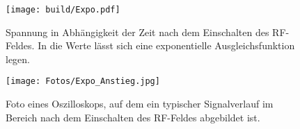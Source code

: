 \begin{figure}
    \centering
    \texttt{[image: build/Expo.pdf]}
    \caption{Spannung in Abhängigkeit der Zeit nach dem Einschalten des RF-Feldes. In die Werte lässt sich eine exponentielle Ausgleichsfunktion legen.}
    \label{fig:expo_graf}
\end{figure}

\begin{figure}
    \centering
    \texttt{[image: Fotos/Expo\_Anstieg.jpg]}
    \caption{Foto eines Oszilloskops, auf dem ein typischer Signalverlauf im Bereich nach dem Einschalten des RF-Feldes abgebildet ist.}
    \label{fig:expo_foto}
\end{figure}
%
